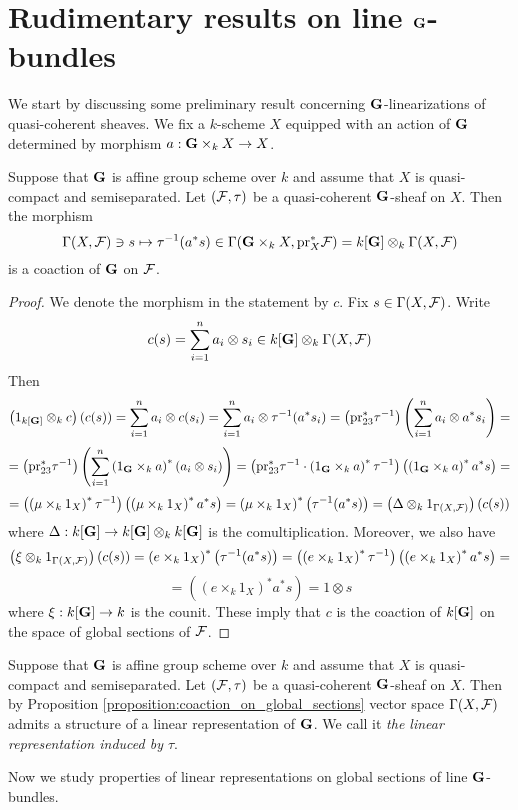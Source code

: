 \section{Rudimentary results on line $\mathbf{G}$-bundles}
\noindent
We start by discussing some preliminary result concerning $\mathbf{G}$-linearizations of quasi-coherent sheaves. We fix a $k$-scheme $X$ equipped with an action of $\mathbf{G}$ determined by morphism $a:\mathbf{G}\times_kX\rightarrow X$.

\begin{proposition}\label{proposition:coaction_on_global_sections}
Suppose that $\mathbf{G}$ is affine group scheme over $k$ and assume that $X$ is quasi-compact and semiseparated. Let $({\mathcal F},\tau)$ be a quasi-coherent $\mathbf{G}$-sheaf on $X$. Then the morphism
$$\Gamma(X,{\mathcal F})\ni s \mapsto \tau^{-1}(a^*s) \in \Gamma(\mathbf{G}\times_kX,\mathrm{pr}^*_X{\mathcal F}) = k[\mathbf{G}]\otimes_k\Gamma(X,{\mathcal F})$$
is a coaction of $\mathbf{G}$ on ${\mathcal F}$.
\end{proposition}
\begin{proof}
We denote the morphism in the statement by $c$. Fix $s\in \Gamma(X,{\mathcal F})$. Write
$$c(s) = \sum_{i=1}^na_i\otimes s_i\in k[\mathbf{G}]\otimes_k\Gamma(X,{\mathcal F})$$
Then
$$\left(1_{k[\mathbf{G}]}\otimes_kc\right)\left(c(s)\right) = \sum_{i=1}^na_i\otimes c(s_i) = \sum_{i=1}^na_i\otimes \tau^{-1}(a^*s_i) = \left(\mathrm{pr}_{23}^*\tau^{-1}\right)\left(\sum_{i=1}^na_i \otimes a^*s_i\right) = $$
$$=\left(\mathrm{pr}_{23}^*\tau^{-1}\right)\left(\sum_{i=1}^n\left(1_{\mathbf{G}}\times_ka\right)^*\left(a_i \otimes s_i\right)\right)=\left(\mathrm{pr}_{23}^*\tau^{-1} \cdot \left(1_{\mathbf{G}}\times_ka\right)^*\tau^{-1}\right)\left(\left(1_{\mathbf{G}}\times_ka\right)^*a^*s\right) =$$
$$= \left(\left(\mu\times_k1_X\right)^*\tau^{-1}\right)\left(\left(\mu\times_k1_X\right)^*a^*s\right) =\left(\mu\times_k1_X\right)^*\left(\tau^{-1}(a^*s)\right) = \left(\Delta \otimes_k 1_{\Gamma(X,{\mathcal F})}\right)\left(c(s)\right)$$
where $\Delta:k[\mathbf{G}]\rightarrow k[\mathbf{G}]\otimes_kk[\mathbf{G}]$ is the comultiplication. Moreover, we also have
$$\left(\xi\otimes_k1_{\Gamma(X,{\mathcal F})}\right)\left(c(s)\right) = \left(e\times_k1_{X}\right)^*\left(\tau^{-1}(a^*s)\right) = \left(\left(e\times_k1_{X}\right)^*\tau^{-1}\right)\left(\left(e\times_k1_{X}\right)^*a^*s\right) =$$
$$= \left(\left(e\times_k1_{X}\right)^*a^*s\right) = 1\otimes s$$
where $\xi:k[\mathbf{G}]\rightarrow k$ is the counit. These imply that $c$ is the coaction of $k[\mathbf{G}]$ on the space of global sections of ${\mathcal F}$.
\end{proof}

\begin{definition}
Suppose that $\mathbf{G}$ is affine group scheme over $k$ and assume that $X$ is quasi-compact and semiseparated. Let $({\mathcal F},\tau)$ be a quasi-coherent $\mathbf{G}$-sheaf on $X$. Then by Proposition \ref{proposition:coaction_on_global_sections} vector space $\Gamma(X,{\mathcal F})$ admits a structure of a linear representation of $\mathbf{G}$. We call it \textit{the linear representation induced by $\tau$}.
\end{definition}
\noindent
Now we study properties of linear representations on global sections of line $\mathbf{G}$-bundles.

